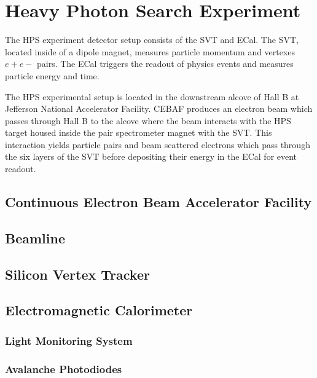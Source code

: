 \documentclass[12pt]{report}
\begin{document}
\chapter{Heavy Photon Search Experiment}
The HPS experiment detector setup consists of the SVT and ECal. The SVT, located inside of a dipole magnet, measures particle momentum and vertexes $e+e-$ pairs. The ECal triggers the readout of physics events and measures particle energy and time. \par
The HPS experimental setup is located in the downstream alcove of Hall B at Jefferson National Accelerator Facility. CEBAF produces an electron beam which passes through Hall B to the alcove where the beam interacts with the HPS target housed inside the pair spectrometer magnet with the SVT. This interaction yields particle pairs and beam scattered electrons which pass through the six layers of the SVT before depositing their energy in the ECal for event readout.

\section{Continuous Electron Beam Accelerator Facility}


\section{Beamline}


\section{Silicon Vertex Tracker}


\section{Electromagnetic Calorimeter}


\subsection{Light Monitoring System}


\subsection{Avalanche Photodiodes}

\end{document}
